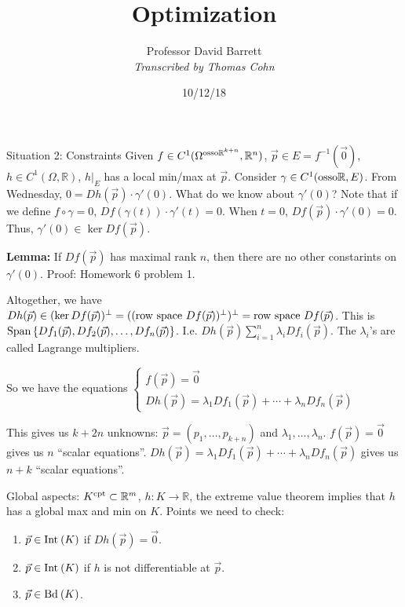 \documentclass[10pt,letterpaper]{article}
\author{Professor David Barrett\\ \small\textit{Transcribed by Thomas Cohn}}
\title{Optimization}
\date{10/12/18} %
\newcommand{\n}{\hfill\break}
\newcommand{\lemma}[1]{\par\noindent\settowidth{\hangindent}{\textbf{Lemma: }}\textbf{Lemma: }#1}
\newcommand{\ptxt}[1]{\textrm{\textnormal{#1}}}
\newcommand{\set}[1]{\left\{#1\right\}}
\newcommand{\reals}{\mathbb{R}}
\newcommand{\R}{\reals}
\newcommand{\inv}{^{-1}}
\newcommand{\of}{\circ}
\newcommand{\Span}{\ptxt{Span}}
\newcommand{\Int}{\ptxt{Int}\>}
\newcommand{\Bd}{\ptxt{Bd}\>}
\begin{document}
\maketitle
\setlength\RaggedRightParindent{\parindent}
\RaggedRight

\par\noindent Situation 2: Constraints\n
Given $f\in{}C^{1}(\Omega^{\ptxt{osso}\R^{k+n}},\R^{n})$, $\vec{p}\in{}E=f\inv(\vec{0})$, $h\in{}C^{1}(\Omega,\R)$, $h|_{E}$ has a local min/max at $\vec{p}$.\n
Consider $\gamma\in{}C^{1}(\ptxt{osso}\R,E)$. From Wednesday, $0=Dh(\vec{p})\cdot\gamma'(0)$. What do we know about $\gamma'(0)$?\n
Note that if we define $f\of\gamma=0$, $Df(\gamma(t))\cdot\gamma'(t)=0$. When $t=0$, $Df(\vec{p})\cdot\gamma'(0)=0$.\n
Thus, $\gamma'(0)\in\ker{}Df(\vec{p})$.\n

\lemma{If $Df(\vec{p})$ has maximal rank $n$, then there are no other constarints on $\gamma'(0)$.\n
Proof: Homework 6 problem 1.\n}

\par\noindent Altogether, we have $Dh(\vec{p})\in(\ker{}Df(\vec{p}))^{\perp}=((\ptxt{row space }Df(\vec{p}))^{\perp})^{\perp}=\ptxt{row space }Df(\vec{p})$.\n
This is $\Span\set{Df_{1}(\vec{p}), Df_{2}(\vec{p}),\ldots,Df_{n}(\vec{p})}$. I.e. $Dh(\vec{p})\sum_{i=1}^{n}\lambda_{i}Df_{i}(\vec{p})$. The $\lambda_{i}$'s are called Lagrange multipliers.\n

\par\noindent So we have the equations $\left\{\begin{array}{l}f(\vec{p})=\vec{0}\\ Dh(\vec{p})=\lambda_{1}Df_{1}(\vec{p})+\cdots+\lambda_{n}Df_{n}(\vec{p})\end{array}\right.$\n

\par\noindent This gives us $k+2n$ unknowns: $\vec{p}=(p_{1},\ldots,p_{k+n})$ and $\lambda_{1},\ldots,\lambda_{n}$.\n
$f(\vec{p})=\vec{0}$ gives us $n$ ``scalar equations''.\n
$Dh(\vec{p})=\lambda_{1}Df_{1}(\vec{p})+\cdots+\lambda_{n}Df_{n}(\vec{p})$ gives us $n+k$ ``scalar equations''.\n

\par\noindent Global aspects: $K^{\ptxt{cpt}}\subset\R^{m}$, $h:K\to\R$, the extreme value theorem implies that $h$ has a global max and min on $K$. Points we need to check:
\begin{enumerate}
	\item $\vec{p}\in\Int(K)$ if $Dh(\vec{p})=\vec{0}$.
	\item $\vec{p}\in\Int(K)$ if $h$ is not differentiable at $\vec{p}$.
	\item $\vec{p}\in\Bd(K)$.
\end{enumerate}
\end{document}
